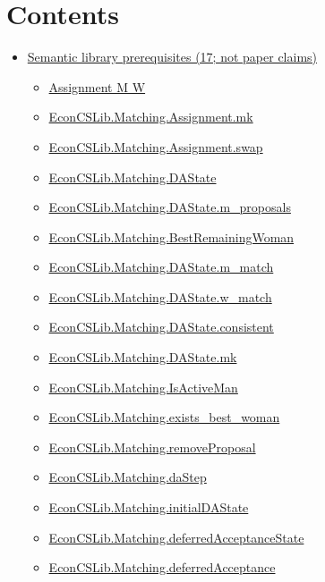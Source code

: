 \documentclass[10pt]{article}
\begin{document}
\section*{Contents}
\begin{itemize}[leftmargin=1.2em]
\item \hyperlink{library-section-0c510c317e2b6223}{Semantic library prerequisites (17; not paper claims)}
\begin{itemize}[leftmargin=1.2em]
\item \hyperlink{library-prerequisite-696efabb1e6e61e6}{Assignment M W}
\item \hyperlink{library-prerequisite-3a48a492dbaa97aa}{EconCSLib.Matching.Assignment.mk}
\item \hyperlink{library-prerequisite-ae8c7c18274f4768}{EconCSLib.Matching.Assignment.swap}
\item \hyperlink{library-prerequisite-75d5b066bfbed958}{EconCSLib.Matching.DAState}
\item \hyperlink{library-prerequisite-1e72e6838a39f31b}{EconCSLib.Matching.DAState.m\_proposals}
\item \hyperlink{library-prerequisite-165bcbe66e2d4d10}{EconCSLib.Matching.BestRemainingWoman}
\item \hyperlink{library-prerequisite-2a4544d30767f1f8}{EconCSLib.Matching.DAState.m\_match}
\item \hyperlink{library-prerequisite-195b6c3333685760}{EconCSLib.Matching.DAState.w\_match}
\item \hyperlink{library-prerequisite-54486bebfa8220c4}{EconCSLib.Matching.DAState.consistent}
\item \hyperlink{library-prerequisite-8fc508b4ea79859d}{EconCSLib.Matching.DAState.mk}
\item \hyperlink{library-prerequisite-676fe9e83c789602}{EconCSLib.Matching.IsActiveMan}
\item \hyperlink{library-prerequisite-905f5d7f350912ad}{EconCSLib.Matching.exists\_best\_woman}
\item \hyperlink{library-prerequisite-159b891590b0737c}{EconCSLib.Matching.removeProposal}
\item \hyperlink{library-prerequisite-d0c1731dee1678fa}{EconCSLib.Matching.daStep}
\item \hyperlink{library-prerequisite-148cb9561d8b9357}{EconCSLib.Matching.initialDAState}
\item \hyperlink{library-prerequisite-732520feff67f701}{EconCSLib.Matching.deferredAcceptanceState}
\item \hyperlink{library-prerequisite-9aab9fc301ec38e5}{EconCSLib.Matching.deferredAcceptance}

\end{itemize}
\end{itemize}
\end{document}
